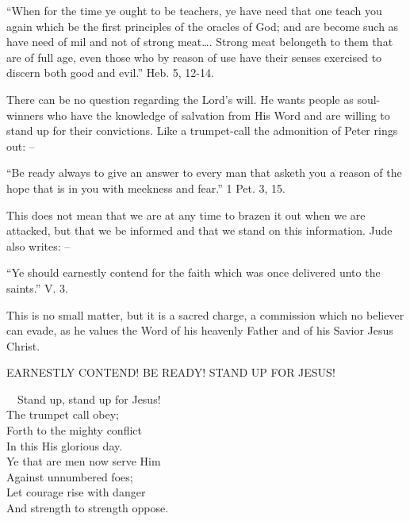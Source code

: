 \documentclass[
]{book}
\begin{document}
``When for the time ye ought to be teachers, ye have need that one teach you again which be the first principles of the oracles of God; and are become such as have need of mil and not of strong meat\ldots. Strong meat belongeth to them that are of full age, even those who by reason of use have their senses exercised to discern both good and evil.'' Heb. 5, 12-14.

There can be no question regarding the Lord's will. He wants people as soul-winners who have the knowledge of salvation from His Word and are willing to stand up for their convictions. Like a trumpet-call the admonition of Peter rings out: --

``Be ready always to give an answer to every man that asketh you a reason of the hope that is in you with meekness and fear.'' 1 Pet. 3, 15.

This does not mean that we are at any time to brazen it out when we are attacked, but that we be informed and that we stand on this information. Jude also writes: --

``Ye should earnestly contend for the faith which was once delivered unto the saints.'' V. 3.

This is no small matter, but it is a sacred charge, a commission which no believer can evade, as he values the Word of his heavenly Father and of his Savior Jesus Christ.

\begin{center} EARNESTLY CONTEND!  BE READY!  STAND UP FOR JESUS! \end{center}

~~Stand up, stand up for Jesus!\\
\hspace*{0.333em}\hspace*{0.333em}The trumpet call obey;\\
\hspace*{0.333em}\hspace*{0.333em}Forth to the mighty conflict\\
\hspace*{0.333em}\hspace*{0.333em}In this His glorious day.\\
\hspace*{0.333em}\hspace*{0.333em}Ye that are men now serve Him\\
\hspace*{0.333em}\hspace*{0.333em}Against unnumbered foes;\\
\hspace*{0.333em}\hspace*{0.333em}Let courage rise with danger\\
\hspace*{0.333em}\hspace*{0.333em}And strength to strength oppose.
\end{document}
